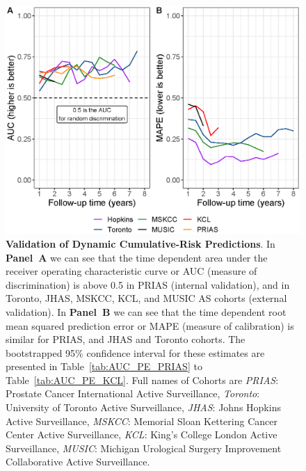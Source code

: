 \begin{figure}[!htb]
\centerline{\includegraphics[width=\columnwidth]{images/auc_pe.eps}}
\caption{\textbf{Validation of Dynamic Cumulative-Risk Predictions}. In \textbf{Panel~A} we can see that the time dependent area under the receiver operating characteristic curve or AUC (measure of discrimination) is above 0.5 in PRIAS (internal validation), and in Toronto, JHAS, MSKCC, KCL, and MUSIC AS cohorts (external validation). In \textbf{Panel~B} we can see that the time dependent root mean squared prediction error or MAPE (measure of calibration) is similar for PRIAS, and JHAS and Toronto cohorts. The bootstrapped 95\% confidence interval for these estimates are presented in Table~\ref{tab:AUC_PE_PRIAS} to Table~\ref{tab:AUC_PE_KCL}. Full names of Cohorts are \textit{PRIAS}: Prostate Cancer International Active Surveillance, \textit{Toronto}: University of Toronto Active Surveillance, \textit{JHAS}: Johns Hopkins Active Surveillance, \textit{MSKCC}: Memorial Sloan Kettering Cancer Center Active Surveillance, \textit{KCL}: King's College London Active Surveillance, \textit{MUSIC}: Michigan Urological Surgery Improvement Collaborative Active Surveillance.}
\label{fig:auc_pe}
\end{figure}

